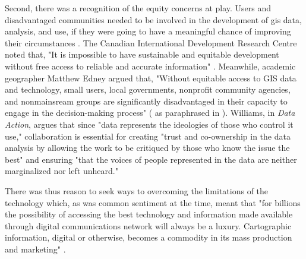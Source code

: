 Second, there was a recognition of the equity concerns at play. Users and disadvantaged communities needed to be involved in the development of \ac{gis} data, analysis, and use, if they were going to have a meaningful chance of improving their circumstances \cite{talenBottomUpGIS2000}. The Canadian International Development Research Centre noted that, "It is impossible to have sustainable and equitable development without free access to reliable and accurate information" \cite{benmouffokInformationDecisionMaking1993}. Meanwhile, academic geographer Matthew Edney argued that, "Without equitable access to GIS data and technology, small users, local governments, nonprofit community agencies, and nonmainsream groups are significantly disadvantaged in their capacity to engage in the decision-making process" (\cite{edney1991strategies} as paraphrased in \cite{harrisPursuingSocialGoals1994}). Williams, in \textit{Data Action}, argues that since "data represents the ideologies of those who control it use," collaboration is essential for creating "trust and co-ownership in the data analysis by allowing the work to be critiqued by those who know the issue the best" and ensuring "that the voices of people represented in the data are neither marginalized nor left unheard."

There was thus reason to seek ways to overcoming the limitations of the technology which, as was common sentiment at the time, meant that "for billions the possibility of accessing the best technology and information made available through digital communications network will always be a luxury. Cartographic information, digital or otherwise, becomes a commodity in its mass production and marketing" \cite{mchaffieManufacturingMetaphors1994}. 

